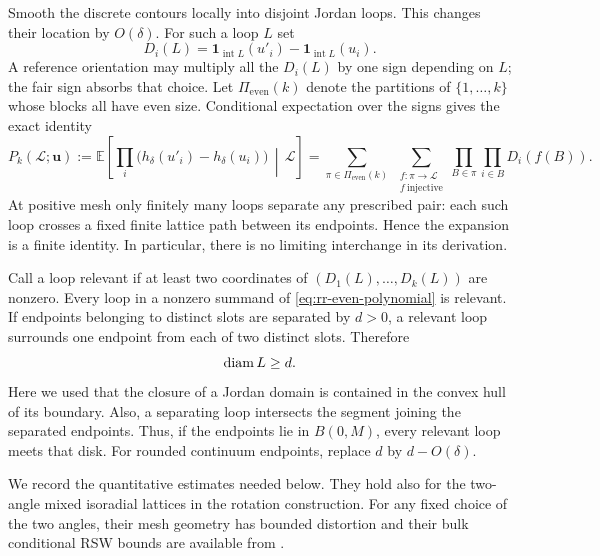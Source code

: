 Smooth the discrete contours locally into disjoint Jordan loops.  This
changes their location by $O(\delta)$.  For such a loop $L$ set
\[
 D_i(L)=\mathbf1_{\operatorname{int}L}(u'_i)
                   -\mathbf1_{\operatorname{int}L}(u_i).
\]
A reference orientation may multiply all the $D_i(L)$ by one sign
depending on $L$; the fair sign absorbs that choice.  Let
$\Pi_{\mathrm{even}}(k)$ denote the partitions of $\{1,\ldots,k\}$
whose blocks all have even size.  Conditional expectation over the
signs gives the exact identity
\begin{equation}
 P_k(\mathcal L;\boldsymbol u)
 :=\mathbb E\left[\prod_i
       \bigl(h_\delta(u'_i)-h_\delta(u_i)\bigr)
                         \,\middle|\,\mathcal L\right]
 =\sum_{\pi\in\Pi_{\mathrm{even}}(k)}
   \ \sum_{\substack{f:\pi\to\mathcal L\\f\ \mathrm{injective}}}
          \prod_{B\in\pi}\prod_{i\in B}D_i(f(B)).
 \label{eq:rr-even-polynomial}
\end{equation}
At positive mesh only finitely many loops separate any prescribed
pair: each such loop crosses a fixed finite lattice path between its
endpoints.  Hence the expansion is a finite identity.  In particular,
there is no limiting interchange in its derivation.

Call a loop relevant if at least two coordinates of
$(D_1(L),\ldots,D_k(L))$ are nonzero.  Every loop in a nonzero summand
of \eqref{eq:rr-even-polynomial} is relevant.  If endpoints belonging
to distinct slots are separated by $d>0$, a relevant loop surrounds
one endpoint from each of two distinct slots.  Therefore
\begin{equation}
 \operatorname{diam} L\ge d.
 \label{eq:rr-macro}
\end{equation}
Here we used that the closure of a Jordan domain is contained in the
convex hull of its boundary.  Also, a separating loop intersects the
segment joining the separated endpoints.  Thus, if the endpoints lie
in $B(0,M)$, every relevant loop meets that disk.  For rounded
continuum endpoints, replace $d$ by $d-O(\delta)$.

We record the quantitative estimates needed below.  They hold also
for the two-angle mixed isoradial lattices in the rotation
construction.  For any fixed choice of the two angles, their mesh
geometry has bounded distortion and their bulk conditional RSW
bounds are available from
\cite[Theorem~2.2, Remark~2.3 and Proposition~2.12]{DCKKMO2026Rotation}.

